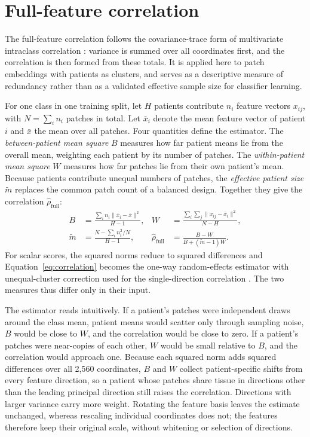 \documentclass[11pt]{article}
\begin{document}
\section{Full-feature correlation}
\label{sec:correlation}
The full-feature correlation follows the covariance-trace form of multivariate intraclass correlation \citep{shou2013reliability}: variance is summed over all coordinates first, and the correlation is then formed from these totals. It is applied here to patch embeddings with patients as clusters, and serves as a descriptive measure of redundancy rather than as a validated effective sample size for classifier learning.

For one class in one training split, let $H$ patients contribute $n_i$ feature vectors $x_{ij}$, with $N=\sum_i n_i$ patches in total. Let $\bar x_i$ denote the mean feature vector of patient $i$ and $\bar x$ the mean over all patches. Four quantities define the estimator. The \emph{between-patient mean square} $B$ measures how far patient means lie from the overall mean, weighting each patient by its number of patches. The \emph{within-patient mean square} $W$ measures how far patches lie from their own patient's mean. Because patients contribute unequal numbers of patches, the \emph{effective patient size} $\widetilde m$ replaces the common patch count of a balanced design. Together they give the correlation $\widehat\rho_{\mathrm{full}}$:
\begin{align}
 B&=\frac{\sum_i n_i\lVert\bar x_i-\bar x\rVert^2}{H-1},
 & W&=\frac{\sum_i\sum_j\lVert x_{ij}-\bar x_i\rVert^2}{N-H},\nonumber\\
 \widetilde m&=\frac{N-\sum_i n_i^2/N}{H-1},
 & \widehat\rho_{\mathrm{full}}&=\frac{B-W}{B+(\widetilde m-1)W}.
 \label{eq:correlation}
\end{align}
\noindent For scalar scores, the squared norms reduce to squared differences and Equation~\eqref{eq:correlation} becomes the one-way random-effects estimator with unequal-cluster correction used for the single-direction correlation \citep{kenny1985separating}. The two measures thus differ only in their input.

The estimator reads intuitively. If a patient's patches were independent draws around the class mean, patient means would scatter only through sampling noise, $B$ would be close to $W$, and the correlation would be close to zero. If a patient's patches were near-copies of each other, $W$ would be small relative to $B$, and the correlation would approach one. Because each squared norm adds squared differences over all 2,560 coordinates, $B$ and $W$ collect patient-specific shifts from every feature direction, so a patient whose patches share tissue in directions other than the leading principal direction still raises the correlation. Directions with larger variance carry more weight. Rotating the feature basis leaves the estimate unchanged, whereas rescaling individual coordinates does not; the features therefore keep their original scale, without whitening or selection of directions.
\end{document}
